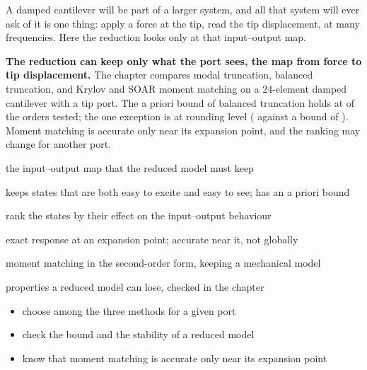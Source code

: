 \newpage\thispagestyle{hl}
\begin{hlquote}A damped cantilever will be part of a larger system, and all that system will ever ask of it is one thing: apply a force at the tip, read the tip displacement, at many frequencies. Here the reduction looks only at that input--output map.\end{hlquote}
\vspace{8pt}\begin{hlsum}\textbf{The reduction can keep only what the port sees, the map from force to tip displacement.} The chapter compares modal truncation, balanced truncation, and Krylov and SOAR moment matching on a 24-element damped cantilever with a tip port. The a priori bound of balanced truncation holds at \cbtBoundHolds{} of the \cbtBoundCases{} orders tested; the one exception is at rounding level (\cbtMissErr{} against a bound of \cbtMissBound). Moment matching is accurate only near its expansion point, and the ranking may change for another port.\end{hlsum}
\begin{description}\setlength\itemsep{5pt}\setlength\parsep{0pt}\renewcommand{\descriptionlabel}[1]{\hspace{\labelsep}\sffamily\bfseries\color{hlnavy}#1}
\item[Transfer function, port] the input--output map that the reduced model must keep
\item[Balanced truncation] keeps states that are both easy to excite and easy to see; has an a priori bound
\item[Hankel singular values] rank the states by their effect on the input--output behaviour
\item[Krylov moment matching] exact response at an expansion point; accurate near it, not globally
\item[SOAR] moment matching in the second-order form, keeping a mechanical model
\item[Stability and passivity] properties a reduced model can lose, checked in the chapter
\end{description}
\begin{itemize}\setlength\itemsep{3pt}
\item choose among the three methods for a given port
\item check the bound and the stability of a reduced model
\item know that moment matching is accurate only near its expansion point
\end{itemize}
